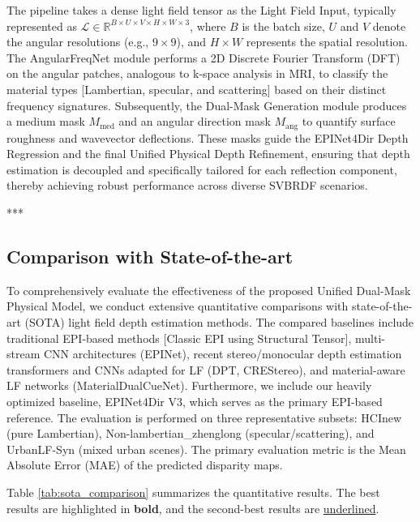 \documentclass[lettersize,journal]{IEEEtran}
\begin{document}
The pipeline takes a dense light field tensor as the Light Field Input, typically represented as $\mathcal{L} \in \mathbb{R}^{B \times U \times V \times H \times W \times 3}$, where $B$ is the batch size, $U$ and $V$ denote the angular resolutions (e.g., $9 \times 9$), and $H \times W$ represents the spatial resolution. The AngularFreqNet module performs a 2D Discrete Fourier Transform (DFT) on the angular patches, analogous to k-space analysis in MRI, to classify the material types  [Lambertian, specular, and scattering] based on their distinct frequency signatures. Subsequently, the Dual-Mask Generation module produces a medium mask $M_{\text{med}}$ and an angular direction mask $M_{\text{ang}}$ to quantify surface roughness and wavevector deflections. These masks guide the EPINet4Dir Depth Regression and the final Unified Physical Depth Refinement, ensuring that depth estimation is decoupled and specifically tailored for each reflection component, thereby achieving robust performance across diverse SVBRDF scenarios.

***


\subsection{Comparison with State-of-the-art}

To comprehensively evaluate the effectiveness of the proposed Unified Dual-Mask Physical Model, we conduct extensive quantitative comparisons with state-of-the-art (SOTA) light field depth estimation methods. The compared baselines include traditional EPI-based methods  [Classic EPI using Structural Tensor], multi-stream CNN architectures (EPINet), recent stereo/monocular depth estimation transformers and CNNs adapted for LF (DPT, CREStereo), and material-aware LF networks (MaterialDualCueNet). Furthermore, we include our heavily optimized baseline, EPINet4Dir V3, which serves as the primary EPI-based reference. The evaluation is performed on three representative subsets: HCInew (pure Lambertian), Non-lambertian\_zhenglong (specular/scattering), and UrbanLF-Syn (mixed urban scenes). The primary evaluation metric is the Mean Absolute Error (MAE) of the predicted disparity maps.

Table \ref{tab:sota_comparison} summarizes the quantitative results. The best results are highlighted in \textbf{bold}, and the second-best results are \underline{underlined}.
\end{document}
